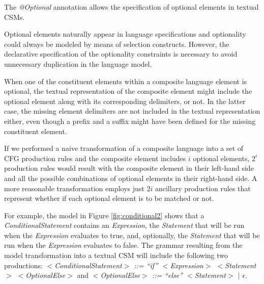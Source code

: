\documentclass[a4paper,twoside,onecolumn]{article}
\newcommand{\etexttt}[1]{\textit{#1}}
\newcommand{\an}[1]{\emph{#1}} %
\begin{document}
The \an{@Optional} annotation allows the specification of optional elements in textual CSMs.

Optional elements naturally appear in language specifications and optionality could always be modeled by means of selection constructs.
However, the declarative specification of the optionality constraints is necessary to avoid unnecessary duplication in the language model.

When one of the constituent elements within a composite language element is optional, the textual representation of the composite element might include the optional element along with its corresponding delimiters, or not.
In the latter case, the missing element delimiters are not included in the textual representation either, even though a prefix and a suffix might have been defined for the missing constituent element.

If we performed a naive transformation of a composite language into a set of CFG production rules and the composite element includes $i$ optional elements, $2^i$ production rules would result with the composite element in their left-hand side and all the possible combinations of optional elements in their right-hand side.
A more reasonable transformation employs just $2i$ ancillary production rules that represent whether if each optional element is to be matched or not.

For example, the model in Figure \ref{fig:conditional2} shows that a \emph{ConditionalStatement} contains an \emph{Expression}, the \emph{Statement} that will be run when the \emph{Expression} evaluates to true, and, optionally, the \emph{Statement} that will be run when the \emph{Expression} evaluates to false.
The grammar resulting from the model transformation into a textual CSM will include the following two productions: \etexttt{$<$ConditionalStatement$>$ ::= ``if'' $<$Expression$>$ $<$Statement$>$ $<$OptionalElse$>$} and \etexttt{$<$OptionalElse$>$ ::= ``else'' $<$Statement$>$ $|$ $\epsilon$}.
\end{document}
